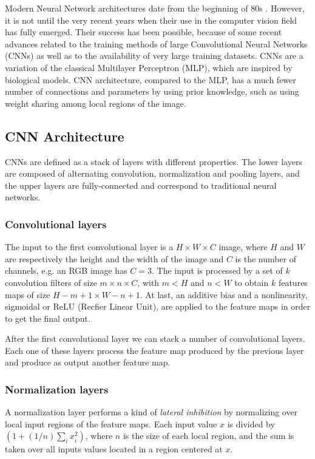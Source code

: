 \documentclass[review,12pt,3p]{elsarticle}
\begin{document}
Modern Neural Network architectures date from the beginning of 80s \cite{fukushima1980neocognitron}. However, it is not until the very recent years when their use in the computer vision field has fully emerged. Their success has been possible, because of some recent advances related to the training methods of large Convolutional Neural Networks (CNNs) \cite{krizhevsky2012imagenet} as well as to the availability of very large training datasets. CNNs are a variation of the classical Multilayer Perceptron (MLP), which are inspired by biological models. CNN architecture, compared to the MLP, has a much fewer number of connections and parameters by using prior knowledge, such as using weight sharing among local regions of the image.

\subsection{CNN Architecture}
CNNs are defined as a stack of layers with different properties. The lower layers are composed of alternating convolution, normalization and pooling layers, and the upper layers are fully-connected and correspond to traditional neural networks.

\subsubsection{Convolutional layers}

The input to the first convolutional layer is a $H \times W \times C$ image, where $H$ and $W$ are respectively the height and the width of the image and $C$ is the number of channels, e.g. an RGB image has $C=3$. The input is processed by a set of $k$ convolution filters of size $m \times n \times C$, with $m < H$ and $n < W$ to obtain $k$ features maps of size $H-m+1 \times W-n+1$. At last, an additive bias and a nonlinearity, sigmoidal or ReLU (Recfier Linear Unit), are applied to the feature maps in order to get the final output.

After the first convolutional layer we can stack a number of convolutional layers. Each one of these layers process the feature map produced by the previous layer and produce as output another feature map.

\subsubsection{Normalization layers}
A normalization layer performs a kind of {\em lateral inhibition} by normalizing over local input regions of the feature maps. Each input value $x$ is divided by $(1+(1/n) \sum_i x_i^2)$, where $n$ is the size of each local region, and the sum is taken over all inputs values located in a region centered at $x$.
\end{document}
